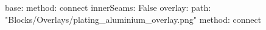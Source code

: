 base:
  method: connect
  innerSeams: False
overlay:
  path: "Blocks/Overlays/plating_aluminium_overlay.png"
  method: connect

